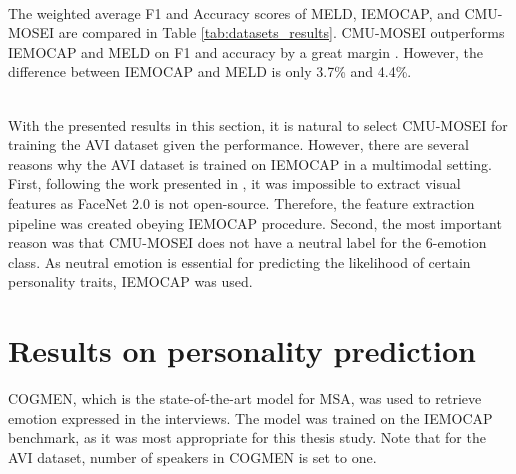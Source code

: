 %
\\
The weighted average F1 and Accuracy scores of MELD, IEMOCAP, and CMU-MOSEI are compared in Table \ref{tab:datasets_results}. CMU-MOSEI outperforms IEMOCAP and MELD on F1 and accuracy by a great margin \cite{HP_Advanced}. However, the difference between IEMOCAP and MELD is only 3.7\% and 4.4\%.
%
\begin{table}[h]
\caption{Comparison of COGMEN performed on the three datasets.}
\centering
{}
\label{tab:datasets_results}
\end{table}
%
\\
With the presented results in this section, it is natural to select CMU-MOSEI for training the AVI dataset given the performance. However, there are several reasons why the AVI dataset is trained on IEMOCAP in a multimodal setting. First, following the work presented in \cite{cmu-mosei_zadeh2018multimodal}, it was impossible to extract visual features as FaceNet 2.0 is not open-source. Therefore, the feature extraction pipeline was created obeying IEMOCAP procedure. Second, the most important reason was that CMU-MOSEI does not have a neutral label for the 6-emotion class. As neutral emotion is essential for predicting the likelihood of certain personality traits, IEMOCAP was used. 

\section{Results on personality prediction}
\label{sec:results_personality}
COGMEN, which is the state-of-the-art model for MSA, was used to retrieve emotion expressed in the interviews. The model was trained on the IEMOCAP benchmark, as it was most appropriate for this thesis study. Note that for the AVI dataset, number of speakers in COGMEN is set to one.  \\

